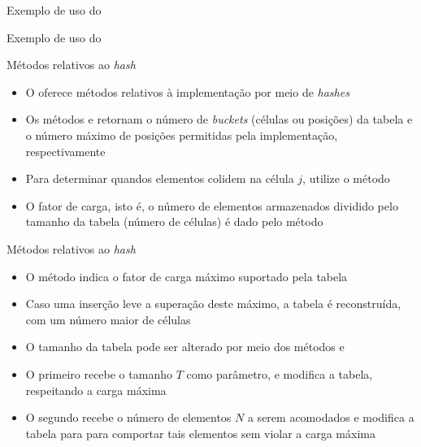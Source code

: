 \begin{frame}[fragile]{Exemplo de uso do }
\end{frame}

\begin{frame}[fragile]{Exemplo de uso do }
\end{frame}

\begin{frame}[fragile]{Métodos relativos ao {\it hash}}

    \begin{itemize}
        \item O  oferece métodos relativos à implementação por meio de
            \textit{hashes}

        \item Os métodos  e  retornam
            o número de \textit{buckets} (células ou posições) da tabela e o número máximo de
            posições permitidas pela implementação, respectivamente

        \item Para determinar quandos elementos colidem na célula $j$, utilize o método

        \item O fator de carga, isto é, o número de elementos armazenados dividido pelo
            tamanho da tabela (número de células) é dado pelo método 

    \end{itemize}

\end{frame}

\begin{frame}[fragile]{Métodos relativos ao {\it hash}}

    \begin{itemize}
        \item O método  indica o fator de carga máximo suportado
            pela tabela

        \item Caso uma inserção leve a superação deste máximo, a tabela é reconstruída, com um
            número maior de células

        \item O tamanho da tabela pode ser alterado por meio dos métodos 
            e 

        \item O primeiro recebe o tamanho $T$ como parâmetro, e modifica a tabela, respeitando
            a carga máxima

        \item O segundo recebe o número de elementos $N$ a serem acomodados e modifica a tabela
            para para comportar tais elementos sem violar a carga máxima
    \end{itemize}

\end{frame}

